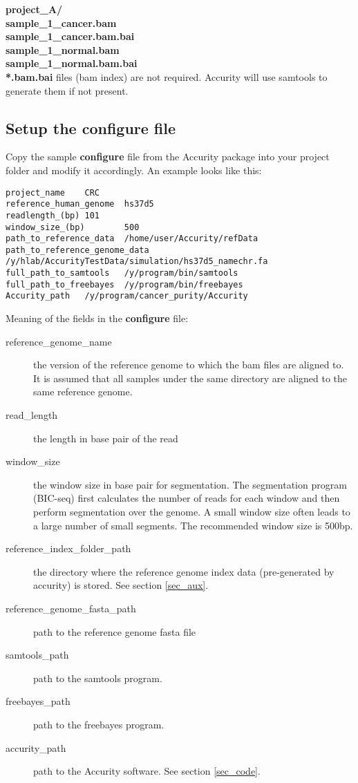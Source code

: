 \documentclass{article}
\begin{document}
\indent \textbf{project\_A/} \\
\indent \indent \textbf{sample\_1\_cancer.bam} \\
\indent \indent \textbf{sample\_1\_cancer.bam.bai} \\
\indent \indent \textbf{sample\_1\_normal.bam} \\
\indent \indent \textbf{sample\_1\_normal.bam.bai} \\


\textbf{*.bam.bai} files (bam index) are not required. Accurity will use samtools to generate them if not present.


\subsection{Setup the configure file}

Copy the sample \textbf{configure} file from the Accurity package into your project folder and modify it accordingly. An example looks like this:

\begin{verbatim}
project_name    CRC
reference_human_genome  hs37d5
readlength_(bp) 101
window_size_(bp)        500
path_to_reference_data  /home/user/Accurity/refData
path_to_reference_genome_data   /y/hlab/AccurityTestData/simulation/hs37d5_namechr.fa
full_path_to_samtools   /y/program/bin/samtools
full_path_to_freebayes  /y/program/bin/freebayes
Accurity_path   /y/program/cancer_purity/Accurity
\end{verbatim}


Meaning of the fields in the \textbf{configure} file:

\begin{description}
  \item[reference\_genome\_name] the version of the reference genome to which
  the bam files are aligned to. It is assumed that all samples under the same directory are aligned to the same reference genome.
  \item[read\_length] the length in base pair of the read
  \item[window\_size] the window size in base pair for segmentation. The segmentation program (BIC-seq) first calculates the number of reads for each window and then perform segmentation over the genome. A small window size often leads to a large number of small segments. The recommended window size is 500bp.
  \item[reference\_index\_folder\_path] the directory where the reference genome index data (pre-generated by accurity) is stored. See section \ref{sec_aux}.
  \item[reference\_genome\_fasta\_path] path to the reference genome fasta file
  \item[samtools\_path] path to the samtools program.
  \item[freebayes\_path] path to the freebayes program.
  \item[accurity\_path] path to the Accurity software. See section \ref{sec_code}.
\end{description}
\end{document}
